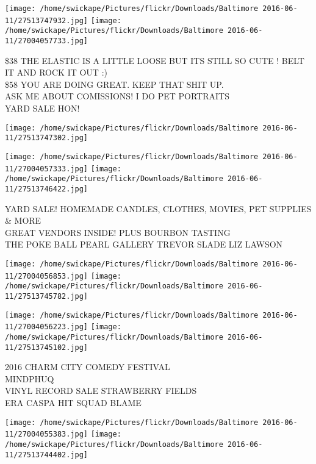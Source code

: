 \documentclass[10pt,letterpaper]{article}
\begin{document}
\texttt{[image: /home/swickape/Pictures/flickr/Downloads/Baltimore 2016-06-11/27513747932.jpg]}
\texttt{[image: /home/swickape/Pictures/flickr/Downloads/Baltimore 2016-06-11/27004057733.jpg]}

\$38 THE ELASTIC IS A LITTLE LOOSE BUT ITS STILL SO CUTE !  BELT IT AND ROCK IT OUT :)\\
\$58 YOU ARE DOING GREAT.  KEEP THAT SHIT UP.\\
ASK ME ABOUT COMISSIONS!  I DO PET PORTRAITS\\
YARD SALE HON!\\
\pagebreak

\texttt{[image: /home/swickape/Pictures/flickr/Downloads/Baltimore 2016-06-11/27513747302.jpg]}

\vspace{0.25in}
\texttt{[image: /home/swickape/Pictures/flickr/Downloads/Baltimore 2016-06-11/27004057333.jpg]}
\texttt{[image: /home/swickape/Pictures/flickr/Downloads/Baltimore 2016-06-11/27513746422.jpg]}

YARD SALE!  HOMEMADE CANDLES, CLOTHES, MOVIES, PET SUPPLIES \& MORE\\
GREAT VENDORS INSIDE!  PLUS BOURBON TASTING\\
THE POKE BALL PEARL GALLERY TREVOR SLADE LIZ LAWSON\\
\pagebreak

\texttt{[image: /home/swickape/Pictures/flickr/Downloads/Baltimore 2016-06-11/27004056853.jpg]}
\texttt{[image: /home/swickape/Pictures/flickr/Downloads/Baltimore 2016-06-11/27513745782.jpg]}

\texttt{[image: /home/swickape/Pictures/flickr/Downloads/Baltimore 2016-06-11/27004056223.jpg]}
\texttt{[image: /home/swickape/Pictures/flickr/Downloads/Baltimore 2016-06-11/27513745102.jpg]}

2016 CHARM CITY COMEDY FESTIVAL\\
MINDPHUQ\\
VINYL RECORD SALE STRAWBERRY FIELDS\\
ERA CASPA HIT SQUAD BLAME\\
\pagebreak

\texttt{[image: /home/swickape/Pictures/flickr/Downloads/Baltimore 2016-06-11/27004055383.jpg]}
\texttt{[image: /home/swickape/Pictures/flickr/Downloads/Baltimore 2016-06-11/27513744402.jpg]}
\end{document}
